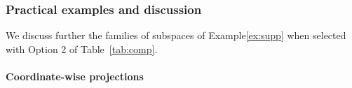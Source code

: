 {
\subsubsection{Practical examples and discussion}\label{sec:ex_ada}

We discuss further the families of subspaces of Example\;\ref{ex:supp} when selected with Option 2 of Table~\ref{tab:comp}.

\paragraph{Coordinate-wise projections}\label{Pex:l1}

}
